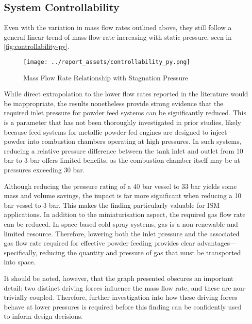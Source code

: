 \subsection{System Controllability}
Even with the variation in mass flow rates outlined above, they still follow a general linear trend of mass flow rate increasing with static pressure, seen in \autoref{fig:controllability-py}.
\begin{figure}[htbp]
    \centering

    \begin{minipage}{0.45\textwidth}
        \centering
        \texttt{[image: ../report\_assets/controllability\_py.png]}
        \caption{Mass Flow Rate Relationship with Stagnation Pressure}\label{fig:controllability-py}
    \end{minipage}    
\end{figure}    
While direct extrapolation to the lower flow rates reported in the literature would be inappropriate, the results nonetheless provide strong evidence that the required inlet pressure for powder feed systems can be significantly reduced. This is a parameter that has not been thoroughly investigated in prior studies, likely because feed systems for metallic powder-fed engines are designed to inject powder into combustion chambers operating at high pressures. In such systems, reducing a relative pressure difference between the tank inlet and outlet from 10 bar to 3 bar offers limited benefits, as the combustion chamber itself may be at pressures exceeding 30 bar. 

Although reducing the pressure rating of a 40 bar vessel to 33 bar yields some mass and volume savings, the impact is far more significant when reducing a 10 bar vessel to 3 bar. This makes the finding particularly valuable for ISM applications. In addition to the miniaturisation aspect, the required gas flow rate can be reduced. In space-based cold spray systems, gas is a non-renewable and limited resource. Therefore, lowering both the inlet pressure and the associated gas flow rate required for effective powder feeding provides clear advantages—specifically, reducing the quantity and pressure of gas that must be transported into space.


It should be noted, however, that the graph presented obscures an important detail: two distinct driving forces influence the mass flow rate, and these are non-trivially coupled. Therefore, further investigation into how these driving forces behave at lower pressures is required before this finding can be confidently used to inform design decisions.

